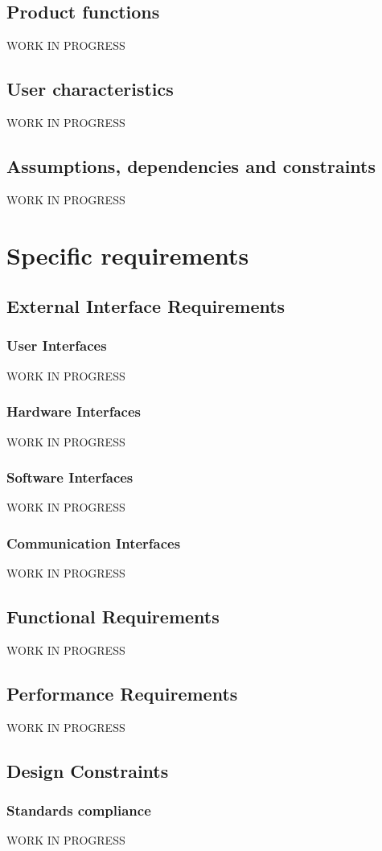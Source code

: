 \documentclass{report}
\begin{document}
		\section{Product functions}
		WORK IN PROGRESS
		\section{User characteristics}
		WORK IN PROGRESS
		\section{Assumptions, dependencies and constraints}
		WORK IN PROGRESS
	\chapter{Specific requirements}
		\section{External Interface Requirements}
			\subsection{User Interfaces}
			WORK IN PROGRESS
			\subsection{Hardware Interfaces}
			WORK IN PROGRESS
			\subsection{Software Interfaces}
			WORK IN PROGRESS
			\subsection{Communication Interfaces}
			WORK IN PROGRESS
		\section{Functional Requirements}
		WORK IN PROGRESS
		\section{Performance Requirements}
		WORK IN PROGRESS
		\section{Design Constraints}
			\subsection{Standards compliance}
			WORK IN PROGRESS
\end{document}
